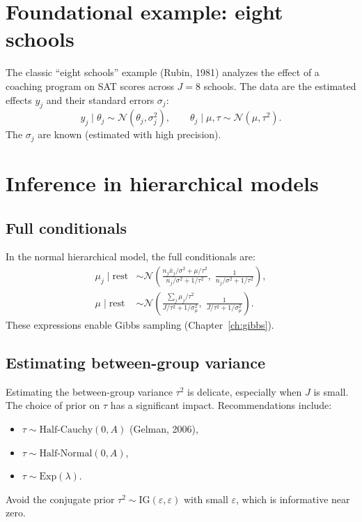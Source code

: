 \section{Foundational example: eight schools}

\begin{example}
The classic ``eight schools'' example (Rubin, 1981) analyzes the
effect of a coaching program on SAT scores across $J = 8$ schools.
The data are the estimated effects $y_j$ and their standard errors
$\sigma_j$:
\[
  y_j \mid \theta_j \sim \mathcal{N}(\theta_j, \sigma_j^2), \qquad
  \theta_j \mid \mu, \tau \sim \mathcal{N}(\mu, \tau^2).
\]
The $\sigma_j$ are known (estimated with high precision).
\end{example}

\section{Inference in hierarchical models}

\subsection{Full conditionals}

\begin{proposition}
In the normal hierarchical model, the full conditionals are:
\begin{align*}
  \mu_j \mid \text{rest} &\sim \mathcal{N}\!\left(
  \frac{n_j\bar{x}_j/\sigma^2 + \mu/\tau^2}{n_j/\sigma^2 + 1/\tau^2},\;
  \frac{1}{n_j/\sigma^2 + 1/\tau^2}\right), \\
  \mu \mid \text{rest} &\sim \mathcal{N}\!\left(
  \frac{\sum_j \mu_j / \tau^2}{J/\tau^2 + 1/\sigma_\mu^2},\;
  \frac{1}{J/\tau^2 + 1/\sigma_\mu^2}\right).
\end{align*}
These expressions enable Gibbs sampling
(Chapter~\ref{ch:gibbs}).
\end{proposition}

\subsection{Estimating between-group variance}

\begin{warning}[title=\textbf{Difficulty of estimating $\tau$}]
Estimating the between-group variance $\tau^2$ is delicate, especially
when $J$ is small. The choice of prior on $\tau$ has a significant
impact. Recommendations include:
\begin{itemize}
  \item $\tau \sim \text{Half-Cauchy}(0, A)$ (Gelman, 2006),
  \item $\tau \sim \text{Half-Normal}(0, A)$,
  \item $\tau \sim \text{Exp}(\lambda)$.
\end{itemize}
Avoid the conjugate prior $\tau^2 \sim \text{IG}(\varepsilon, \varepsilon)$
with small $\varepsilon$, which is informative near zero.
\end{warning}

